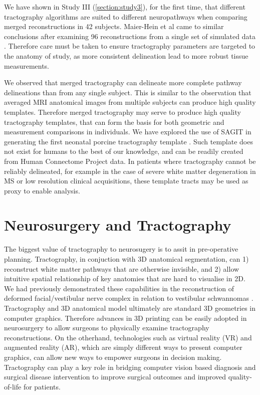 We have shown in Study III (\ref{section:study3}), for the first time, that different tractography algorithms are suited to different neuropathways when comparing merged reconstructions in 42 subjects. Maier-Hein et al came to similar conclusions after examining 96 reconstructions from a single set of simulated data \cite{Maier-Hein2017}.
Therefore care must be taken to ensure tractography parameters are targeted to the anatomy of study, as more consistent delineation lead to more robust tissue measurements.

We observed that merged tractography can delineate more complete pathway delineations than from any single subject. This is similar to the observation that averaged MRI anatomical images from multiple subjects can produce high quality templates. Therefore merged tractography may serve to produce high quality tractography templates, that can form the basis for both geometric and measurement comparisons in individuals. We have explored the use of SAGIT in generating the first neonatal porcine tractography template \cite{Zhong2016a}. Such template does not exist for humans to the best of our knowledge, and can be readily created from Human Connectome Project data. In patients where tractography cannot be reliably delineated, for example in the case of severe white matter degeneration in MS or low resolution clinical acquisitions, these template tracts may be used as proxy to enable analysis.


\section{Neurosurgery and Tractography}

The biggest value of tractography to neurosugery is to assit in pre-operative planning. Tractography, in conjuction with 3D anatomical segmentation, can 1) reconstruct white matter pathways that are otherwise invisible, and 2) allow intuitive spatial relationship of key anatomies that are hard to visualise in 2D. We had previously demonstrated these capabilities in the reconstruction of deformed facial/vestibular nerve complex in relation to vestibular schwannomas \cite{Chen2011b,Behan2017}. Tractography and 3D anatomical model ultimately are standard 3D geometries in computer graphics. Therefore advances in 3D printing can be easily adopted in neurosurgery to allow surgeons to physically examine tractography reconstructions. On the otherhand, technologies such as virtual reality (VR) and augmented reality (AR), which are simply different ways to present computer graphics, can allow new ways to empower surgeons in decision making. Tractography can play a key role in bridging computer vision based diagnosis and surgical disease intervention to improve surgical outcomes and improved quality-of-life for patients.    


